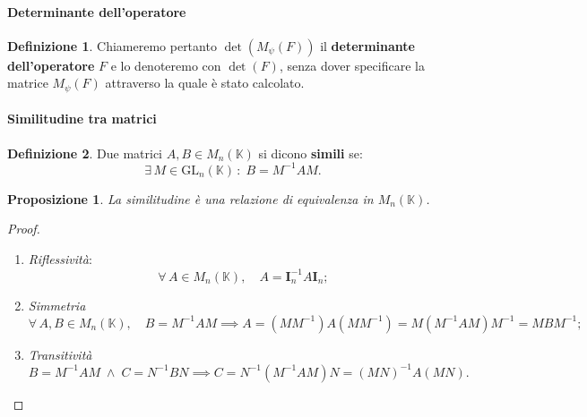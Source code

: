 \documentclass{article}
\theoremstyle{plain}
\newtheorem{prop}[thm]{Proposizione}
\theoremstyle{definition}
\newtheorem{defn}{Definizione}[section]
\theoremstyle{remark}
\begin{document}
\paragraph{Determinante dell'operatore}
\begin{bxthm}
\begin{defn}
Chiameremo pertanto \( \det(M_\psi(F)) \) il \textbf{determinante dell'operatore} \( F \) e lo denoteremo con 
\( \det(F) \), senza dover specificare la matrice \( M_\psi(F) \) attraverso la quale è stato calcolato.    
\end{defn}
\end{bxthm}

\vspace{10pt}

\paragraph{Similitudine tra matrici}
\begin{bxthm}
\begin{defn}
Due matrici \( A, B \in M_n(\mathbb{K}) \) si dicono \textbf{simili} se: 
\[\exists\,M \in \mathrm{GL}_n(\mathbb{K}) \,:\; B = M^{-1} A M.\]
\end{defn}
\end{bxthm}

\vspace{10pt}

\begin{bxthm}
\begin{prop}
La similitudine è una relazione di equivalenza in \( M_n(\mathbb{K}) \).    
\end{prop}
\end{bxthm}
\begin{proof}\hfill
\begin{enumerate}
    \item \textit{Riflessività}:
    \[\forall\,A\in M_n(\mathbb{K}),\quad A = \mathbf{I}_n^{-1} A \mathbf{I}_n;\]
    \item \textit{Simmetria}
    \[\forall\,A,B\in M_n(\mathbb{K}),\quad B = M^{-1} A M\implies A = (MM^{-1}) A (MM^{-1}) = M(M^{-1} A M)M^{-1} = M B M^{-1};\]
    \item \textit{Transitività}
    \[B = M^{-1} A M\; \land\; C = N^{-1} B N\implies C = N^{-1}(M^{-1} A M) N = (MN)^{-1} A (MN).\]
\end{enumerate}
\end{proof}

\vspace{10pt}
\end{document}
